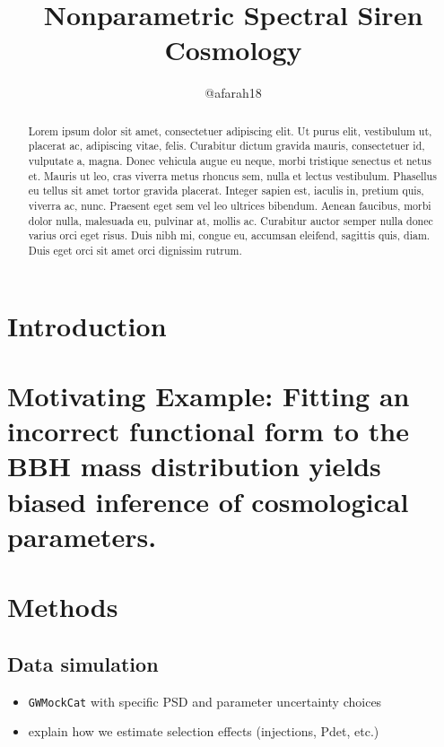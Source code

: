 \documentclass[twocolumn]{aastex631}
\begin{document}
\title{Nonparametric Spectral Siren Cosmology}

\author{@afarah18}

\begin{abstract}
    Lorem ipsum dolor sit amet, consectetuer adipiscing elit.
    Ut purus elit, vestibulum ut, placerat ac, adipiscing vitae, felis.
    Curabitur dictum gravida mauris, consectetuer id, vulputate a, magna.
    Donec vehicula augue eu neque, morbi tristique senectus et netus et.
    Mauris ut leo, cras viverra metus rhoncus sem, nulla et lectus vestibulum.
    Phasellus eu tellus sit amet tortor gravida placerat.
    Integer sapien est, iaculis in, pretium quis, viverra ac, nunc.
    Praesent eget sem vel leo ultrices bibendum.
    Aenean faucibus, morbi dolor nulla, malesuada eu, pulvinar at, mollis ac.
    Curabitur auctor semper nulla donec varius orci eget risus.
    Duis nibh mi, congue eu, accumsan eleifend, sagittis quis, diam.
    Duis eget orci sit amet orci dignissim rutrum.
\end{abstract}

\section{Introduction}
\label{sec:intro}

\section{Motivating Example: Fitting an incorrect functional form to the BBH mass distribution yields biased inference of cosmological parameters.}
\section{Methods}
\subsection{Data simulation}
\begin{itemize}
    \item \texttt{GWMockCat} with specific PSD and parameter uncertainty choices
    \item explain how we estimate selection effects (injections, Pdet, etc.)
\end{itemize}
\end{document}

